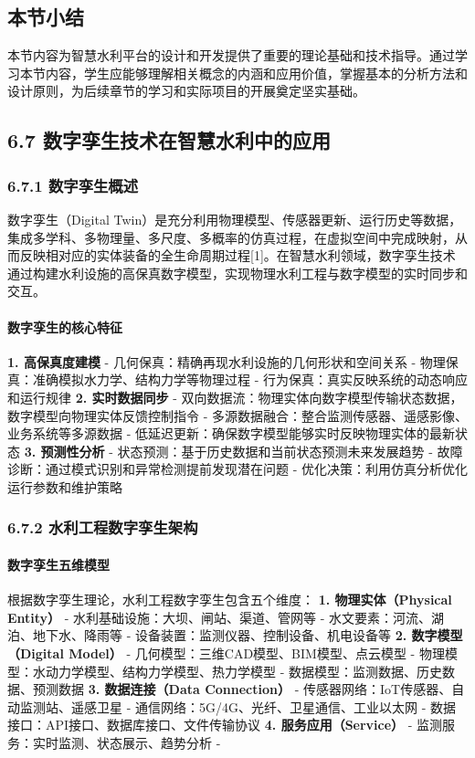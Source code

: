 \subsection{本节小结}\label{ux672cux8282ux5c0fux7ed3} 本节内容为智慧水利平台的设计和开发提供了重要的理论基础和技术指导。通过学习本节内容，学生应能够理解相关概念的内涵和应用价值，掌握基本的分析方法和设计原则，为后续章节的学习和实际项目的开展奠定坚实基础。

\subsection{6.7 数字孪生技术在智慧水利中的应用}\label{ux6570ux5b57ux5b6aux751fux6280ux672fux5728ux667aux6167ux6c34ux5229ux4e2dux7684ux5e94ux7528} \subsubsection{6.7.1 数字孪生概述}\label{ux6570ux5b57ux5b6aux751fux6982ux8ff0} 数字孪生（Digital Twin）是充分利用物理模型、传感器更新、运行历史等数据，集成多学科、多物理量、多尺度、多概率的仿真过程，在虚拟空间中完成映射，从而反映相对应的实体装备的全生命周期过程{[}1{]}。在智慧水利领域，数字孪生技术通过构建水利设施的高保真数字模型，实现物理水利工程与数字模型的实时同步和交互。 \paragraph{数字孪生的核心特征}\label{ux6570ux5b57ux5b6aux751fux7684ux6838ux5fc3ux7279ux5f81} \textbf{1. 高保真度建模} - 几何保真：精确再现水利设施的几何形状和空间关系 - 物理保真：准确模拟水力学、结构力学等物理过程 - 行为保真：真实反映系统的动态响应和运行规律 \textbf{2. 实时数据同步} - 双向数据流：物理实体向数字模型传输状态数据，数字模型向物理实体反馈控制指令 - 多源数据融合：整合监测传感器、遥感影像、业务系统等多源数据 - 低延迟更新：确保数字模型能够实时反映物理实体的最新状态 \textbf{3. 预测性分析} - 状态预测：基于历史数据和当前状态预测未来发展趋势 - 故障诊断：通过模式识别和异常检测提前发现潜在问题 - 优化决策：利用仿真分析优化运行参数和维护策略 \subsubsection{6.7.2 水利工程数字孪生架构}\label{ux6c34ux5229ux5de5ux7a0bux6570ux5b57ux5b6aux751fux67b6ux6784} \paragraph{数字孪生五维模型}\label{ux6570ux5b57ux5b6aux751fux4e94ux7ef4ux6a21ux578b} 根据数字孪生理论，水利工程数字孪生包含五个维度： \textbf{1. 物理实体（Physical Entity）} - 水利基础设施：大坝、闸站、渠道、管网等 - 水文要素：河流、湖泊、地下水、降雨等 - 设备装置：监测仪器、控制设备、机电设备等 \textbf{2. 数字模型（Digital Model）} - 几何模型：三维CAD模型、BIM模型、点云模型 - 物理模型：水动力学模型、结构力学模型、热力学模型 - 数据模型：监测数据、历史数据、预测数据 \textbf{3. 数据连接（Data Connection）} - 传感器网络：IoT传感器、自动监测站、遥感卫星 - 通信网络：5G/4G、光纤、卫星通信、工业以太网 - 数据接口：API接口、数据库接口、文件传输协议 \textbf{4. 服务应用（Service）} - 监测服务：实时监测、状态展示、趋势分析 - 